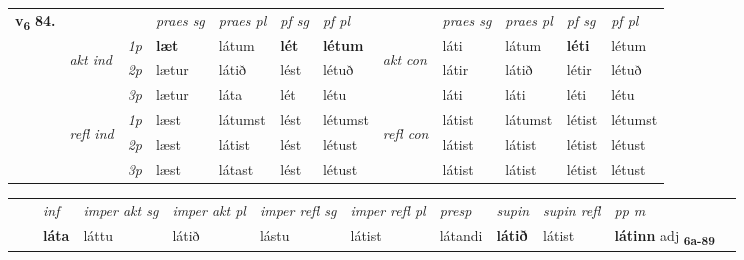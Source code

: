 \begin{tabular}{llllllllllll} \toprule
\multirow{4}{*}{{{\textbf{v{\textsubscript{6}}} \Large{\textbf{84.}}}}}  & &   &  \textit{praes sg}  & \textit{praes pl}  &\textit{ pf sg} & \textit{pf pl} &  &  \textit{praes sg}  & \textit{praes pl}  & \textit{pf sg} & \textit{pf pl } \\*
	\cmidrule{4-7} \cmidrule{9-12}
 & \multirow{3}{*}{\begin{turn}{90}\textit{akt ind}\end{turn}} & {\textit{1p}} & \textbf{læt} & látum    & \textbf{lét} & \textbf{létum} & \multirow{3}{*}{\begin{turn}{90}\textit{akt con}\end{turn}} &láti & látum & \textbf{léti} & létum\\*
& &  {\textit{2p}} &  lætur  & látið   & lést & létuð & & látir & látið & létir & létuð \\*
& &  {\textit{3p}} & lætur & láta   & lét & létu & & láti & láti& léti & létu  \\*
\cmidrule{4-7} \cmidrule{9-12}
 &\multirow{3}{*}{\begin{turn}{90}\textit{refl ind}\end{turn}} & {\textit{1p}} & læst & látumst    & lést & létumst & \multirow{3}{*}{\begin{turn}{90}\textit{refl con}\end{turn}}  &látist & látumst & létist & létumst\\*
 &&  {\textit{2p}} &  læst  & látist   & lést & létust & &látist & látist & létist & létust \\*
& &  {\textit{3p}} & læst & látast   & lést & létust & & látist & látist& létist & létust  \\*
\cmidrule{4-7} \cmidrule{9-12}
\end{tabular}


\begin{tabular}{llllllllllll}
 & & \textit{inf} & \textit{imper akt sg} & \textit{imper akt pl} & \textit{imper refl sg} & \textit{imper refl pl} & \textit{presp} & \textit{supin} & \textit{supin refl} & \textit{pp m}     \\*
  & & \textbf{láta} & láttu  & látið & lástu & látist & látandi &  \textbf{látið} & látist & \textbf{látinn} adj \textbf{\textsubscript{6a-89}} \\*
\cmidrule{1-12}
\end{tabular}




